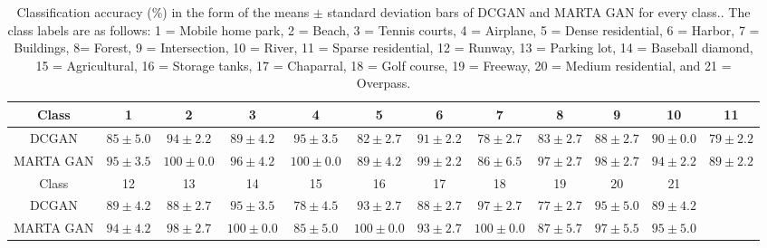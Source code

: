 \documentclass[journal]{IEEEtran}
\begin{document}
\begin{table*}
	\centering
	\scriptsize 
	\caption{ Classification accuracy (\%) in the form of the means $\pm$ standard deviation bars of DCGAN and MARTA GAN for every class.. The class labels are as follows: 1 = Mobile home park, 2 = Beach, 3 = Tennis courts, 4 = Airplane, 5 = Dense residential, 6 = Harbor, 7 = Buildings, 8= Forest, 9 = Intersection, 10 = River, 11 = Sparse residential, 12 = Runway, 13 = Parking lot, 14 = Baseball diamond, 15 = Agricultural, 16 = Storage tanks, 17 = Chaparral, 18 = Golf course, 19 = Freeway, 20 = Medium residential, and 21 = Overpass.}
	\vspace{-0.5em}
	\label{tab:compare_acc}
	\begin{tabular}{|c|ccccccccccc|}
     \hline
		
		Class&1& 2 &3& 4 & 5 & 	6& 7 &8 & 9 &10&11\\ 
		\hline
		DCGAN &$85\pm5.0$ & $94\pm2.2$ & $89\pm4.2$ & $95\pm3.5$ & $82\pm2.7$ & 
			$91\pm2.2$& $78\pm2.7$ & $83\pm2.7$ & $88\pm2.7$ & $90\pm0.0$ & $79\pm2.2$ \\ 
		
		MARTA GAN &$95\pm3.5$& $100\pm0.0$ & $96\pm4.2$ & $100\pm0.0$ &$89\pm4.2$&
			$99\pm2.2$& $86\pm6.5$ & $97\pm2.7$ & $98\pm2.7$ &$94\pm2.2$& $89\pm2.2$
			\\ 
	\hline
		Class&12 & 13 & 14 & 15 & 16 &17 &18 &19 &20 &21 &\\ 
	\hline	
		DCGAN& $89\pm4.2$ & $88\pm2.7$ & $95\pm3.5$ & $78\pm4.5$ & 
		$93\pm2.7$& $88\pm2.7$ & $97\pm2.7$ & $77\pm2.7$ & $95\pm5.0$ & 	$89\pm4.2$&\\ 
		MARTA GAN&  $94\pm4.2$ & $98\pm2.7$ & $100\pm0.0$ &$85\pm5.0$
		&	$100\pm0.0$& $93\pm2.7$ & $100\pm0.0$ & $87\pm5.7$ &$97\pm5.5$&$95\pm5.0$ &

	\\ 
	\hline
	\end{tabular}
\vspace{-6mm}
\end{table*}
\end{document}
